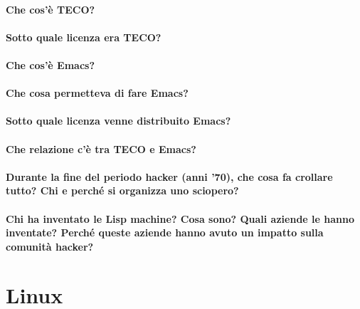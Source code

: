 \documentclass[a4paper]{article}
\begin{document}
		\paragraph{Che cos'è TECO?}
	
		\paragraph{Sotto quale licenza era TECO?}
	
		\paragraph{Che cos'è Emacs?} %
	
		\paragraph{Che cosa permetteva di fare Emacs?}
	
		\paragraph{Sotto quale licenza venne distribuito Emacs?}

		\paragraph{Che relazione c'è tra TECO e Emacs?}
		
		
		\paragraph{Durante la fine del periodo hacker (anni '70), che cosa fa crollare tutto? Chi e perché si organizza uno sciopero?}
		
		
		\paragraph{Chi ha inventato le Lisp machine? Cosa sono? Quali aziende le hanno inventate? Perché queste aziende hanno avuto un impatto sulla comunità hacker?}
	
	

	\section{Linux}
		
\end{document}

